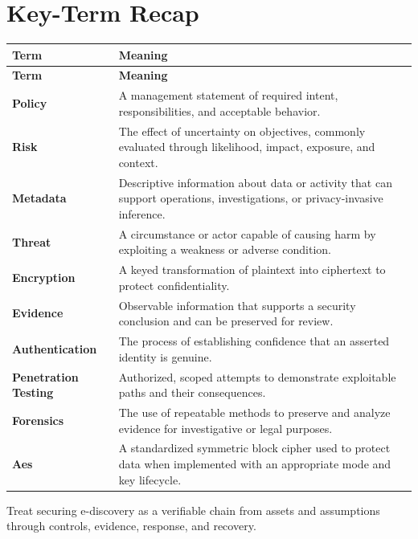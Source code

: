 \documentclass[11pt]{article}
\begin{document}
\section*{Key-Term Recap}
\begin{longtable}{>{\RaggedRight\arraybackslash}p{}>{\RaggedRight\arraybackslash}p{}}
\toprule\rowcolor{Navy}\color{white}\textbf{Term} & \color{white}\textbf{Meaning}\\\midrule
\endfirsthead
\toprule\rowcolor{Navy}\color{white}\textbf{Term} & \color{white}\textbf{Meaning}\\\midrule
\endhead
\textbf{Policy} & A management statement of required intent, responsibilities, and acceptable behavior. \\\midrule
\textbf{Risk} & The effect of uncertainty on objectives, commonly evaluated through likelihood, impact, exposure, and context. \\\midrule
\textbf{Metadata} & Descriptive information about data or activity that can support operations, investigations, or privacy-invasive inference. \\\midrule
\textbf{Threat} & A circumstance or actor capable of causing harm by exploiting a weakness or adverse condition. \\\midrule
\textbf{Encryption} & A keyed transformation of plaintext into ciphertext to protect confidentiality. \\\midrule
\textbf{Evidence} & Observable information that supports a security conclusion and can be preserved for review. \\\midrule
\textbf{Authentication} & The process of establishing confidence that an asserted identity is genuine. \\\midrule
\textbf{Penetration Testing} & Authorized, scoped attempts to demonstrate exploitable paths and their consequences. \\\midrule
\textbf{Forensics} & The use of repeatable methods to preserve and analyze evidence for investigative or legal purposes. \\\midrule
\textbf{Aes} & A standardized symmetric block cipher used to protect data when implemented with an appropriate mode and key lifecycle. \\\midrule
\bottomrule
\end{longtable}
\begin{takeawaybox}
Treat securing e-discovery as a verifiable chain from assets and assumptions through controls, evidence, response, and recovery.
\end{takeawaybox}
\end{document}
